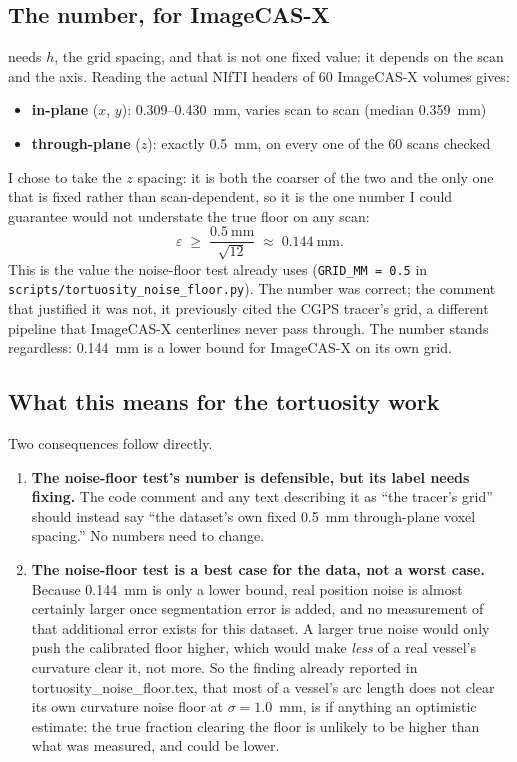 \subsection*{The number, for ImageCAS-X}

 needs $h$, the grid spacing, and that is not one fixed value: it
depends on the scan and the axis. Reading the actual NIfTI headers of 60 ImageCAS-X volumes gives:
\begin{itemize}
  \item \textbf{in-plane} ($x$, $y$): 0.309--0.430~mm, varies scan to scan (median 0.359~mm)
  \item \textbf{through-plane} ($z$): exactly 0.5~mm, on every one of the 60 scans checked
\end{itemize}
I chose to take the $z$ spacing: it is both the coarser of the two and the only one that is
fixed rather than scan-dependent, so it is the one number I could guarantee would not understate
the true floor on any scan:
\[
  \varepsilon \;\geq\; \frac{0.5~\text{mm}}{\sqrt{12}} \;\approx\; 0.144~\text{mm}.
\]
This is the value the noise-floor test already uses (\texttt{GRID\_MM = 0.5} in
\texttt{scripts/tortuosity\_noise\_floor.py}). The number was correct; the comment that justified
it was not, it previously cited the CGPS tracer's grid, a different pipeline that ImageCAS-X
centerlines never pass through. The number stands regardless: 0.144~mm is a lower bound for
ImageCAS-X on its own grid.

\subsection*{What this means for the tortuosity work}

Two consequences follow directly.

\begin{enumerate}
  \item \textbf{The noise-floor test's number is defensible, but its label needs fixing.} The
    code comment and any text describing it as ``the tracer's grid'' should instead say ``the
    dataset's own fixed 0.5~mm through-plane voxel spacing.'' No numbers need to change.
  \item \textbf{The noise-floor test is a best case for the data, not a worst case.} Because
    0.144~mm is only a lower bound, real position noise is almost certainly larger once
    segmentation error is added, and no measurement of that additional error exists for this
    dataset. A larger true noise would only push the calibrated floor higher, which would make
    \emph{less} of a real vessel's curvature clear it, not more. So the finding already reported
    in tortuosity\_noise\_floor.tex, that most of a vessel's arc length does not clear its own
    curvature noise floor at $\sigma = 1.0$~mm, is if anything an optimistic estimate: the true
    fraction clearing the floor is unlikely to be higher than what was measured, and could be
    lower.
\end{enumerate}
